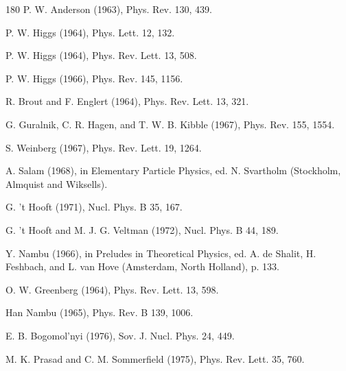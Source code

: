 \begin{thebibliography}{180}
 P. W. Anderson (1963), Phys. Rev. 130, 439.

 P. W. Higgs (1964), Phys. Lett. 12, 132.

 P. W. Higgs (1964), Phys. Rev. Lett. 13, 508.

 P. W. Higgs (1966), Phys. Rev. 145, 1156.

 R. Brout and F. Englert (1964), Phys. Rev. Lett. 13, 321.

 G. Guralnik, C. R. Hagen, and T. W. B. Kibble (1967), Phys. Rev. 155, 1554.

 S. Weinberg (1967), Phys. Rev. Lett. 19, 1264.

 A. Salam (1968), in Elementary Particle Physics, ed. N. Svartholm (Stockholm, Almquist and Wiksells).

 G. 't Hooft (1971), Nucl. Phys. B 35, 167.

 G. 't Hooft and M. J. G. Veltman (1972), Nucl. Phys. B 44, 189.

 Y. Nambu (1966), in Preludes in Theoretical Physics, ed. A. de Shalit, H. Feshbach, and L. van Hove (Amsterdam, North Holland), p. 133.

 O. W. Greenberg (1964), Phys. Rev. Lett. 13, 598.

 Han Nambu (1965), Phys. Rev. B 139, 1006.

 E. B. Bogomol'nyi (1976), Sov. J. Nucl. Phys. 24, 449.

 M. K. Prasad and C. M. Sommerfield (1975), Phys. Rev. Lett. 35, 760.


\end{thebibliography}
